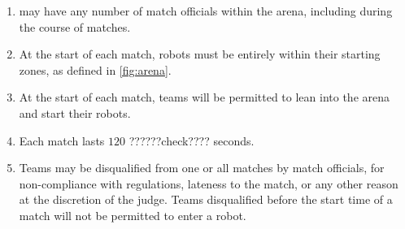 \begin{enumerate}
  \item \org may have any number of match officials within the arena, including
        during the course of matches.
  \item At the start of each match, robots must be entirely within their
        starting zones, as defined in \ref{fig:arena}.
  \item At the start of each match, teams will be permitted to lean into the
        arena and start their robots.
  \item Each match lasts $120$ ??????check???? seconds.
  \item Teams may be disqualified from one or all matches by match officials,
        for non-compliance with regulations, lateness to the match, or any other
        reason at the discretion of the judge. Teams disqualified before the
        start time of a match will not be permitted to enter a robot.
\end{enumerate}

